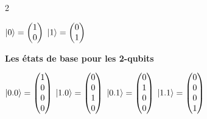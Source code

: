 \documentclass[11pt]{beamer}
\begin{document}
\begin{frame}
\begin{multicols}{2}
\begin{flushright}
\begin{flushleft}
					$\arrowvert 0 \rangle = 
					\begin{pmatrix}
						1 \\
						0
					\end{pmatrix}$ \newline
					$\arrowvert 1 \rangle = 
					\begin{pmatrix}
						0 \\
						1
					\end{pmatrix}$
				\end{flushleft}
			\end{flushright}
		\end{multicols}
		\textbf{{\Large Les états de base pour les 2-qubits}}
		\newline
		\begin{flushleft}
			\quad $\arrowvert 0.0 \rangle = 
			\begin{pmatrix}
				1 \\
				0 \\
				0 \\
				0
			\end{pmatrix}$
			\quad $\arrowvert 1.0 \rangle = 
			\begin{pmatrix}
				0 \\
				0 \\
				1 \\
				0
			\end{pmatrix}$
			\quad $\arrowvert 0.1 \rangle = 
			\begin{pmatrix}
				0 \\
				1 \\
				0 \\
				0
			\end{pmatrix}$
			\quad $\arrowvert 1.1 \rangle = 
			\begin{pmatrix}
				0 \\
				0 \\
				0 \\
				1
			\end{pmatrix}$
		\end{flushleft}
	\end{frame}
	
\end{document}

